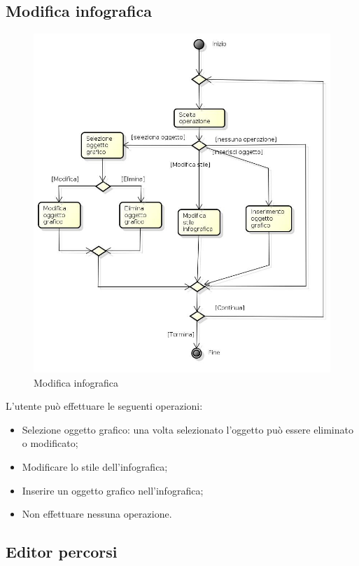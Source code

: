 \subsection{Modifica infografica}

\begin{figure}[h!]
		\centering
		\includegraphics[scale=.2]{img/Modifica_infografica.jpg}
		\caption{Modifica infografica}
		\label{fig:ModelloSpy}
\end{figure}

L'utente può effettuare le seguenti operazioni:
\begin{itemize}
\item Selezione oggetto grafico: una volta selezionato l'oggetto può essere eliminato o modificato;
\item Modificare lo stile dell'infografica;
\item Inserire un oggetto grafico nell'infografica;
\item Non effettuare nessuna operazione.
\end{itemize}

\subsection{Editor percorsi}

